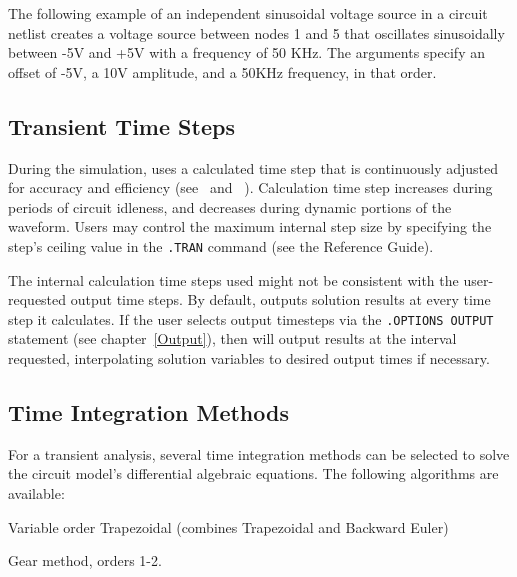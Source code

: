 The following example of an independent sinusoidal voltage source in a
circuit netlist creates a voltage source between nodes 1 and 5
that oscillates sinusoidally between -5V and +5V with a frequency of
50 KHz.  The arguments specify an offset of -5V, a 10V amplitude, and
a 50KHz frequency, in that order.



\subsection{Transient Time Steps}
\label{Time_Steps}
 

During the simulation, \Xyce{} uses a calculated time step that is continuously
adjusted for accuracy and efficiency (see~\cite{WKHH:2000} and
~\cite{Petzold:1996}).  Calculation time step increases during periods of circuit idleness, and decreases during dynamic portions of the waveform.
 Users may control the maximum internal step size by specifying the step's ceiling value in the \verb|.TRAN| command (see the
\Xyce{} Reference Guide\ReferenceGuide{}).

The internal calculation time steps used might not be consistent with the user-requested
 output time steps.  By default,
\Xyce{} outputs solution results at every time step it calculates.  If the user
selects output timesteps via the \verb|.OPTIONS OUTPUT| statement (see
chapter~\ref{Output}), then \Xyce{} will output results at the interval
requested, interpolating solution variables to desired output times if
necessary.


\subsection{Time Integration Methods}
\label{TransientControls}
 
For a transient analysis, several time integration methods can be selected to solve the circuit
model's differential algebraic equations.  The following algorithms are available:

\begin{XyceItemize}
\item Variable order Trapezoidal (combines Trapezoidal and Backward Euler) 
\item Gear method, orders 1-2.
\end{XyceItemize}




